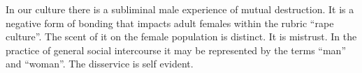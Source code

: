 

In our culture there is a subliminal male experience of mutual
destruction.  It is a negative form of bonding that impacts adult
females within the rubric ``rape culture''.  The scent of it on the
female population is distinct.  It is mistrust.  In the practice of
general social intercourse it may be represented by the terms ``man''
and ``woman''.  The disservice is self evident.  

\bye
